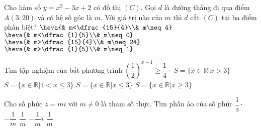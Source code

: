\begin{ex}%
Cho hàm số $y=x^3-3x+2$ có đồ thị $(C)$. Gọi $d$ là đường thẳng đi qua điểm $A(3;20)$ và có hệ số góc là $m$. Với giá trị nào của $m$ thì $d$ cắt $(C)$ tại ba điểm phân biệt?
\choice
{$\heva{& m<\dfrac{15}{4}\\& m\neq 4}$}
{$\heva{& m<\dfrac{1}{5}\\& m\neq 0}$}
{\True $\heva{& m>\dfrac{15}{4}\\& m\neq 24}$}
{$\heva{& m>\dfrac{1}{5}\\& m\neq 1}$}
\end{ex}

\begin{ex}%
Tìm tập nghiệm của bất phương trình $\left(\dfrac{1}{2}\right)^{x-1}\geq \dfrac{1}{4}\cdot$
\choice
{$S=\{x\in\mathbb{R}| x>3\}$}
{$S=\{x\in\mathbb{R}| 1<x\leq 3\}$}
{\True $S=\{x\in\mathbb{R}| x\leq 3\}$}
{$S=\{x\in\mathbb{R}| x\geq 3\}$}
\end{ex}

\begin{ex}%
Cho số phức $z=mi$ với $m\neq 0$ là tham số thực. Tìm phần ảo của số phức $\dfrac{1}{z}\cdot$
\choice
{\True $-\dfrac{1}{m}$}
{$\dfrac{1}{m}$}
{$-\dfrac{1}{m}i$}
{$\dfrac{1}{m}$}
\end{ex}

